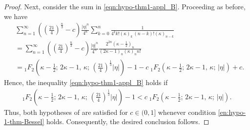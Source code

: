\documentclass[10pt,a4paper]{amsart}
\begin{document}
\begin{proof}
\noindent
Next, consider the sum in \eqref{eqn:hypo-thm1-appl_B}.  
Proceeding as before, we have
\begin{align*}
&\sum_{n=1}^{\infty} \left( \left(\tfrac{21}{4}\right)^{\tfrac{n}{3}}- c\right) 
  \frac{|\eta|^{n}}{4^n} \sum_{k=0}^n  
   \frac{1}{4^k k! (\kappa)_{k}\, (n-k)! (\kappa)_{n-k}} \\
&=\sum_{n=1}^{\infty} \left( \left(\tfrac{21}{4}\right)^{\tfrac{n}{3}}- c\right) 
   \frac{|\eta|^{n}}{4^n}  
   \frac{ 2^{2n} \left(\kappa-\tfrac{1}{2}\right)_{n}}
   {\left(2\kappa-1\right)_{n} \left(\kappa\right)_{n} n!}\\
&= {}_1F_{2}\!\left( \kappa-\tfrac{1}{2};\, 2\kappa-1,\, \kappa;\, 
   \left(\tfrac{21}{4}\right)^{\tfrac{1}{3}} |\eta| \right)- 1
   - c\; {}_1F_{2}\!\left( \kappa-\tfrac{1}{2};\, 2\kappa-1,\, \kappa;\,  |\eta|\right)+c.
\end{align*}
Hence, the inequality \eqref{eqn:hypo-thm1-appl_B} holds if
\begin{align*}
 {}_1F_{2}\!\left( \kappa-\tfrac{1}{2};\, 2\kappa-1,\, \kappa;\, 
   \left(\tfrac{21}{4}\right)^{\tfrac{1}{3}} |\eta| \right)- 1
 < c\; {}_1F_{2}\!\left( \kappa-\tfrac{1}{2};\, 2\kappa-1,\, \kappa;\,  |\eta|\right).
\end{align*}
\noindent
Thus, both hypotheses of  are satisfied for $c \in (0, 1]$ whenever condition \eqref{en:hypo-1-thm-Bessel} holds. Consequently, the desired conclusion follows.
\end{proof}
\end{document}
